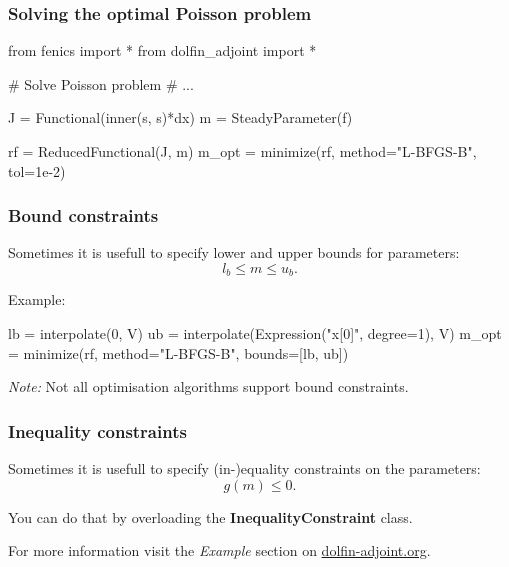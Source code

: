\begin{frame}[fragile]
\frametitle{Solving the optimal Poisson problem}

\begin{python}
from fenics import *
from dolfin_adjoint import *

# Solve Poisson problem
# ...

J = Functional(inner(s, s)*dx)
m = SteadyParameter(f)

rf = ReducedFunctional(J, m)
m_opt = minimize(rf, method="L-BFGS-B", tol=1e-2)
\end{python}


\end{frame}

\begin{frame}[fragile]
\frametitle{Bound constraints}
    Sometimes it is usefull to specify lower and upper bounds for parameters:
    \begin{equation}
        l_b \le m \le u_b.
    \end{equation}

Example:
\begin{python}
lb = interpolate(0, V)
ub = interpolate(Expression("x[0]", degree=1), V)
m_opt = minimize(rf, method="L-BFGS-B", bounds=[lb, ub])
\end{python}
\emph{Note:} Not all optimisation algorithms support bound constraints.
\end{frame}


\begin{frame}[fragile]
\frametitle{Inequality constraints}
Sometimes it is usefull to specify (in-)equality constraints on the parameters:
    \begin{equation}
        g(m) \le 0.
    \end{equation}

You can do that by overloading the \textbf{InequalityConstraint} class. 

For more information visit the \emph{Example} section on \url{dolfin-adjoint.org}.

\end{frame}

